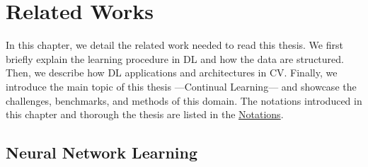 \chapter{Related Works}
\label{chapter:related}


{}



In this chapter, we detail the related work needed to read this thesis. We first briefly
explain the learning procedure in \acf{DL} and how the data are structured. Then, we describe how
\ac{DL} applications and architectures in \acf{CV}. Finally, we introduce the main topic of this thesis
---Continual Learning--- and showcase the challenges, benchmarks, and methods of this domain. The
notations introduced in this chapter and thorough the thesis are listed in the
\hyperref[chap:notations]{Notations}.

\section{Neural Network Learning}


